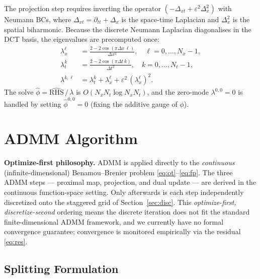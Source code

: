 \documentclass[11pt]{article}
\newcommand{\Dx}{\Delta_x}          %
\newcommand{\Dxt}{\Delta_{xt}}      %
\begin{document}
The projection step requires inverting the operator
$(-\Dxt + \varepsilon^2\Dx^2)$ with Neumann BCs, where
$\Dxt = \partial_{tt}+\Dx$ is the space-time Laplacian and
$\Dx^2$ is the spatial biharmonic.
Because the discrete Neumann Laplacian diagonalises in the DCT basis, the
eigenvalues are precomputed once:
%
\begin{align}
  \lambda_x^\ell &= \frac{2 - 2\cos(\pi\Delta x\,\ell)}{\Delta x^2},
    \quad \ell=0,\ldots,N_x-1, \label{eq:lx}\\
  \lambda_t^k    &= \frac{2 - 2\cos(\pi\Delta t\,k)}{\Delta t^2},
    \quad k=0,\ldots,N_t-1, \label{eq:lt}\\
  \lambda^{k,\ell} &= \lambda_t^k + \lambda_x^\ell
                      + \varepsilon^2\,(\lambda_x^\ell)^2.
    \label{eq:lbih}
\end{align}
%
The solve $\hat\phi = \widehat{\text{RHS}}\,/\,\lambda$ is $O(N_xN_t\log N_xN_t)$,
and the zero-mode $\lambda^{0,0}=0$ is handled by setting $\hat\phi^{0,0}=0$
(fixing the additive gauge of $\phi$).

\section{ADMM Algorithm}

\textbf{Optimize-first philosophy.}
ADMM is applied directly to the \emph{continuous} (infinite-dimensional)
Benamou--Brenier problem \eqref{eq:ot}--\eqref{eq:fp}.
The three ADMM steps --- proximal map, projection, and dual update ---
are derived in the continuous function-space setting.
Only afterwards is each step independently discretized onto the staggered
grid of Section~\ref{sec:disc}.
This \emph{optimize-first, discretize-second} ordering means the discrete
iteration does not fit the standard finite-dimensional ADMM framework, and
we currently have no formal convergence guarantee; convergence is
monitored empirically via the residual \eqref{eq:res}.

\subsection{Splitting Formulation}
\end{document}
